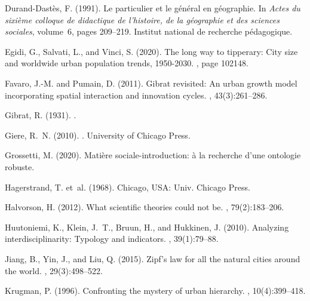 \documentclass[10pt,letterpaper]{article}
\begin{document}
\begin{thebibliography}{}
Durand-Dast{\`e}s, F. (1991).
\newblock Le particulier et le g{\'e}n{\'e}ral en g{\'e}ographie.
\newblock In {\em Actes du sixi{\`e}me colloque de didactique de l'histoire, de
  la g{\'e}ographie et des sciences sociales}, volume~6, pages 209--219.
  Institut national de recherche p{\'e}dagogique.

Egidi, G., Salvati, L., and Vinci, S. (2020).
\newblock The long way to tipperary: City size and worldwide urban population
  trends, 1950-2030.
, page 102148.

Favaro, J.-M. and Pumain, D. (2011).
\newblock Gibrat revisited: An urban growth model incorporating spatial
  interaction and innovation cycles.
, 43(3):261--286.

Gibrat, R. (1931).
.

Giere, R.~N. (2010).
.
\newblock University of Chicago Press.

Grossetti, M. (2020).
\newblock Mati{\`e}re sociale-introduction: {\`a} la recherche d'une ontologie
  robuste.

Hagerstrand, T. et~al. (1968).
\newblock Chicago, USA: Univ. Chicago Press.

Halvorson, H. (2012).
\newblock What scientific theories could not be.
, 79(2):183--206.

Huutoniemi, K., Klein, J.~T., Bruun, H., and Hukkinen, J. (2010).
\newblock Analyzing interdisciplinarity: Typology and indicators.
, 39(1):79--88.

Jiang, B., Yin, J., and Liu, Q. (2015).
\newblock Zipf’s law for all the natural cities around the world.
,
  29(3):498--522.

Krugman, P. (1996).
\newblock Confronting the mystery of urban hierarchy.
,
  10(4):399--418.


\end{thebibliography}
\end{document}
